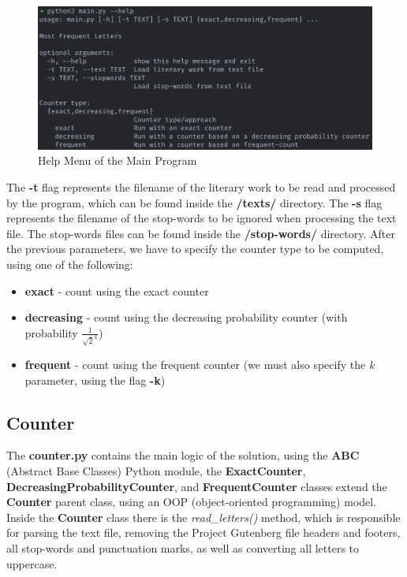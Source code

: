 \documentclass[...]{revdetua}
\begin{document}
\begin{figure}[!htb]
    \centering
    \includegraphics[width=1\columnwidth]{./figures/usage}
    \caption{Help Menu of the Main Program}
    \label{fig: Help Menu}
\end{figure}

The \textbf{-t} flag represents the filename of the literary work to be read and processed by the program, which can be found inside the \textbf{/texts/} directory. The \textbf{-s} flag represents the filename of the stop-words to be ignored when processing the text file. The stop-words files can be found inside the \textbf{/stop-words/} directory. After the previous parameters, we have to specify the counter type to be computed, using one of the following:
\begin{itemize}
    \item \textbf{exact} - count using the exact counter
    \item \textbf{decreasing} - count using the decreasing probability counter (with probability \(\frac{1}{\sqrt{2}^k}\))
    \item \textbf{frequent} - count using the frequent counter (we must also specify the \textit{k} parameter, using the flag \textbf{-k})
\end{itemize}

\subsection{Counter}

The \textbf{counter.py} contains the main logic of the solution, using the \textbf{ABC}\cite{abstract_base_classes} (Abstract Base Classes) Python module, the \textbf{ExactCounter}, \textbf{DecreasingProbabilityCounter}, and \textbf{FrequentCounter} classes extend the \textbf{Counter} parent class, using an OOP (object-oriented programming) model.
Inside the \textbf{Counter} class there is the \textit{read\_letters()} method, which is responsible for parsing the text file, removing the Project Gutenberg file headers and footers, all stop-words and punctuation marks, as well as converting all letters to uppercase.
\end{document}

